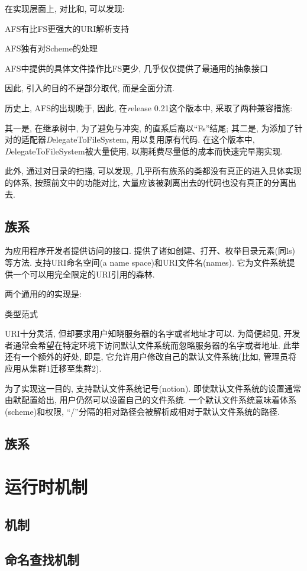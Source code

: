 在实现层面上, 对比{\AFS}和{\FS}, 可以发现:

\begin{XeEnum}
    \item AFS有比FS更强大的URI解析支持
    \item AFS独有对Scheme的处理
    \item AFS中提供的具体文件操作比FS更少, 几乎仅仅提供了最通用的抽象接口
    \item 因此, 引入{\AbsFS}的目的不是部分取代, 而是全面分流.
\end{XeEnum}

历史上, AFS的出现晚于{\FiS}, 因此, 在{\emph release 0.21}这个版本中,
采取了两种兼容措施:

其一是, 在继承树中, 为了避免与{\FiS}冲突, {\AbsFS}的直系后裔以``Fs''结尾;
其二是, 为{\AbsFS}添加了针对{\FiS}的适配器{\emph DelegateToFileSystem},
用以复用原有代码. 在这个版本中, {\emph DelegateToFileSystem}被大量使用,
以期耗费尽量低的成本而快速完早期实现.

此外, 通过对目录的扫描, 可以发现, 几乎所有{\AbsFS}族系的类都没有真正的进入具体实现的体系,
按照前文中的功能对比, 大量应该被剥离出去的代码也没有真正的分离出去.

\subsection{{\FiC}族系}
\label{ssec:hfs:fc}

{\FiC}为应用程序开发者提供访问{\HadoopFS}的接口.
{\FiC}提供了诸如创建、打开、枚举目录元素(同ls)等方法.
{\HadoopFS}支持URI命名空间(a name space)和URI文件名(names).
它为文件系统提供一个可以用完全限定的URI引用的森林.

两个通用的{\HadoopFS}的实现是:
\begin{XeDuoLineTabular}{类型}{范式}
\end{XeDuoLineTabular}

URI十分灵活, 但却要求用户知晓服务器的名字或者地址才可以.
为简便起见, 开发者通常会希望在特定环境下访问默认文件系统而忽略服务器的名字或者地址.
此举还有一个额外的好处, 即是, 它允许用户修改自己的默认文件系统(比如, 管理员将应用从集群1迁移至集群2).

为了实现这一目的, {\Hadoop}支持默认文件系统记号(notion).
即使默认文件系统的设置通常由默配置给出, 用户仍然可以设置自己的文件系统.
一个默认文件系统意味着体系(scheme)和权限, ``/''分隔的相对路径会被解析成相对于默认文件系统的路径.

\subsection{{\Shell}族系}

\section{运行时机制}
\label{sec:hfs:rtm}

\subsection{{\Trash}机制}
\label{ssec:hfs:trashing}

\subsection{命名查找机制}
\label{ssec:hfs:naming}
